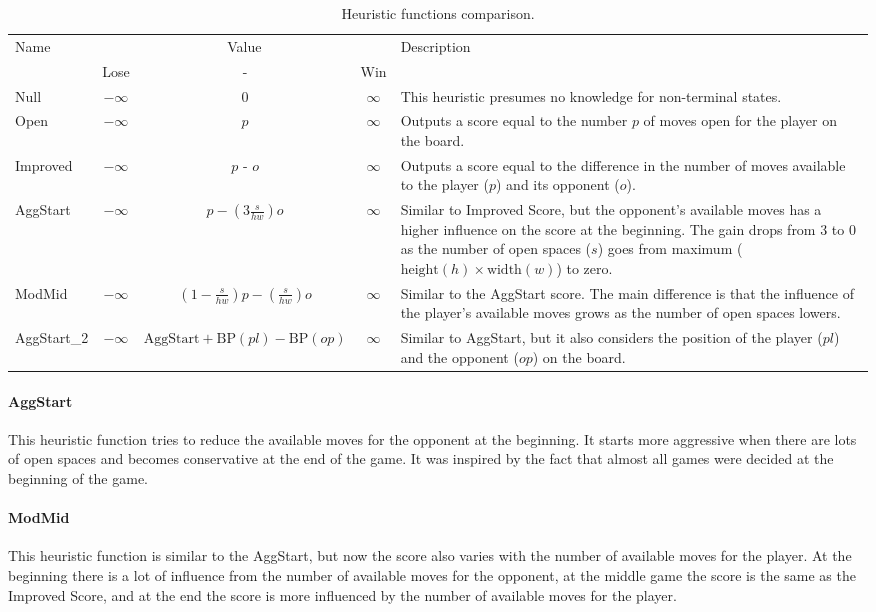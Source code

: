\documentclass[12pt, a4paper]{article}
\begin{document}
	\begin{table}[!h]
		\centering
		\caption{Heuristic functions comparison.}	
		\begin{tabular}{l | ccc | p{4.5cm}}
			\multirow{2}{*}{Name} & \multicolumn{3}{c|}{Value} & \multirow{2}{*}{Description} \\
			     & Lose & - & Win & \\
			\hline
			Null & $-\infty$ & $0$ & $\infty$ & This heuristic presumes no knowledge for non-terminal states. \\
			\hline
			Open & $-\infty$ & $p$ & $\infty$ & Outputs a score
			equal to the number $p$ of moves open for the player on the board. \\
			\hline
			Improved & $-\infty$ & $p$ - $o$ & $\infty$ & Outputs a
			score equal to the difference in the number of moves available to the
			player ($p$) and its opponent ($o$). \\
			\hline
			AggStart & $-\infty$ & $p - \left(3\frac{s}{hw}\right)o$ & $\infty$ & Similar to Improved Score, but the opponent's available moves has a higher influence on the score at the beginning. The gain drops from $3$ to $0$ as the number of open spaces ($s$) goes from maximum ($\textrm{height}(h)\times\textrm{width}(w)$) to zero.\\
			\hline
			ModMid & $-\infty$ & $\left(1-\frac{s}{hw}\right)p - \left(\frac{s}{hw}\right)o$ & $\infty$ & Similar to the AggStart score. The main difference is that the influence of the player's available moves grows as the number of open spaces lowers.\\
			\hline
			AggStart\_2 & $-\infty$ & $\mathrm{AggStart} + \mathrm{BP}(pl)-\mathrm{BP}(op)$ & $\infty$ & Similar to AggStart, but it also considers the position of the player ($pl$) and the opponent ($op$) on the board. \\
		\end{tabular}
	\end{table}

	\paragraph{AggStart} This heuristic function tries to reduce the available moves for the opponent at the beginning. It starts more aggressive when there are lots of open spaces and becomes conservative at the end of the game. It was inspired by the fact that almost all games were decided at the beginning of the game.
	
	\paragraph{ModMid} This heuristic function is similar to the AggStart, but now the score also varies with the number of available moves for the player. At the beginning there is a lot of influence from the number of available moves for the opponent, at the middle game the score is the same as the Improved Score, and at the end the score is more influenced by the number of available moves for the player.
	
\end{document}
